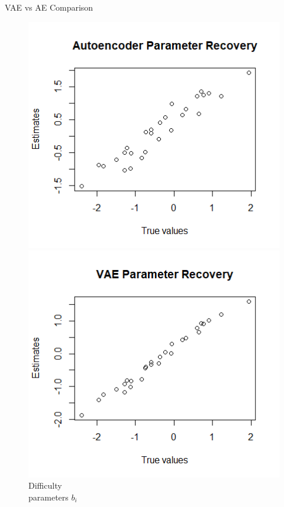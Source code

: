 \documentclass{beamer}
\theoremstyle{definition}
\begin{document}
\begin{frame}{VAE vs AE Comparison}
\begin{figure}[h!]
\includegraphics[width=.9\textwidth]{../img/aied_results/ae_b_corr.png}
\endminipage\hfill
{}
\includegraphics[width=.9\textwidth]{../img/aied_results/vae_b_corr.png}
\endminipage\hfill
{}
{\footnotesize Difficulty \\ parameters $b_i$}
\endminipage\hfill
\end{figure}
\end{frame}
\end{document}
